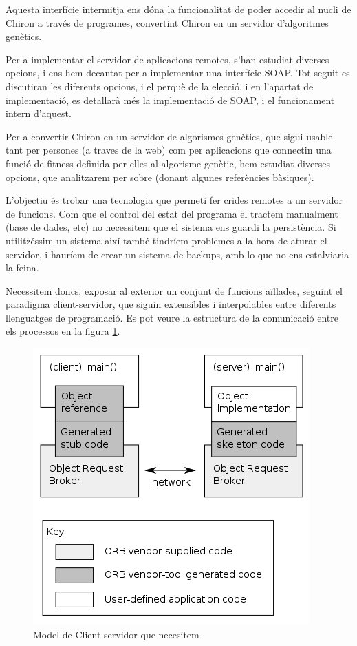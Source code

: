 Aquesta interfície intermitja ens dóna la funcionalitat de poder accedir al
nucli de Chiron a través de programes, convertint Chiron en un servidor 
d'algoritmes genètics.

Per a implementar el servidor de aplicacions remotes, s'han estudiat diverses
opcions, i ens hem decantat per a implementar una interfície SOAP.  Tot seguit
es discutiran les diferents opcions, i el perquè de la elecció, i en l'apartat
de implementació, es detallarà més la implementació de SOAP, i el funcionament
intern d'aquest.


Per a convertir Chiron en un servidor de algorismes genètics, que sigui usable
tant per persones (a traves de la web) com per aplicacions que connectin una
funció de fitness definida per elles al algorisme genètic, hem estudiat diverses
opcions, que analitzarem per sobre (donant algunes referències bàsiques).

L'objectiu és trobar una tecnologia que permeti fer crides remotes a un servidor
de funcions.  Com que el control del estat del programa el tractem manualment
(base de dades, etc) no necessitem que el sistema ens guardi la persistència.
Si utilitzéssim un sistema així també tindríem problemes a la hora de aturar el
servidor, i hauríem de crear un sistema de backups, amb lo que no ens
estalviaria la feina.

Necessitem doncs, exposar al exterior un conjunt de funcions aïllades, seguint el
paradigma client-servidor, que siguin extensibles i interpolables entre
diferents llenguatges de programació. Es pot veure la estructura de la
comunicació entre els processos en la figura \ref{fig:401px-Orb.png}.

\begin{figure}[h]
\centering
\includegraphics[scale=0.5]{401px-Orb.png}
\caption{Model de Client-servidor que necesitem}
\label{fig:401px-Orb.png}
\end{figure} 

